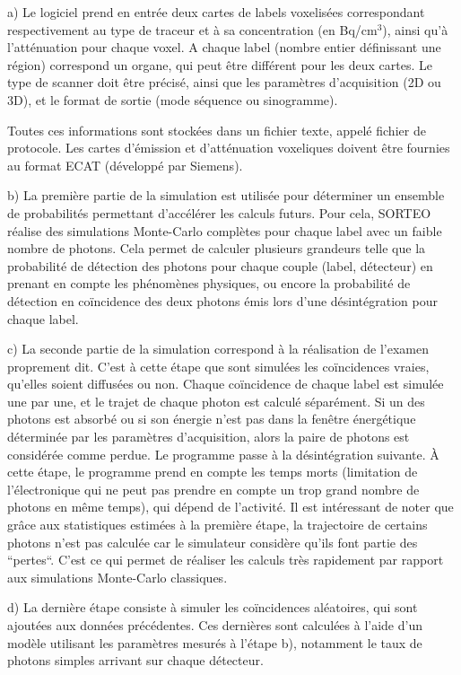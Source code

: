 a) Le logiciel prend en entrée deux cartes de labels voxelisées correspondant respectivement au type de traceur et à sa concentration (en Bq/cm$^3$), ainsi qu'à l'atténuation pour chaque voxel. A chaque label (nombre entier définissant une région) correspond un organe, qui peut être différent pour les deux cartes. Le type de scanner doit être précisé, ainsi que les paramètres d'acquisition (2D ou 3D), et le format de sortie (mode séquence ou sinogramme).

Toutes ces informations sont stockées dans un fichier texte, appelé fichier de protocole. Les cartes d'émission et d'atténuation voxeliques doivent être fournies au format ECAT (développé par Siemens).

b) La première partie de la simulation est utilisée pour déterminer un ensemble de probabilités permettant d'accélérer les calculs futurs. Pour cela, SORTEO réalise des simulations Monte-Carlo complètes pour chaque label avec un faible nombre de photons. Cela permet de calculer plusieurs grandeurs telle que la probabilité de détection des photons pour chaque couple (label, détecteur) en prenant en compte les phénomènes physiques, ou encore la probabilité de détection en coïncidence des deux photons émis lors d'une désintégration pour chaque label.

c) La seconde partie de la simulation correspond à la réalisation de l'examen proprement dit. C'est à cette étape que sont simulées les coïncidences vraies, qu'elles soient diffusées ou non. Chaque coïncidence de chaque label est simulée une par une, et le trajet de chaque photon est calculé séparément. Si un des photons est absorbé ou si son énergie n'est pas dans la fenêtre énergétique déterminée par les paramètres d'acquisition, alors la paire de photons est considérée comme perdue. Le programme passe à la désintégration suivante. \`A cette étape, le programme prend en compte les temps morts (limitation de l'électronique qui ne peut pas prendre en compte un trop grand nombre de photons en même temps), qui dépend de l'activité. Il est intéressant de noter que grâce aux statistiques estimées à la première étape, la trajectoire de certains photons n'est pas calculée car le simulateur considère qu'ils font partie des ``pertes``. C'est ce qui permet de réaliser les calculs très rapidement par rapport aux simulations Monte-Carlo classiques.

d) La dernière étape consiste à simuler les coïncidences aléatoires, qui sont ajoutées aux données précédentes. Ces dernières sont calculées à l'aide d'un modèle utilisant les paramètres mesurés à l'étape b), notamment le taux de photons simples arrivant sur chaque détecteur.


